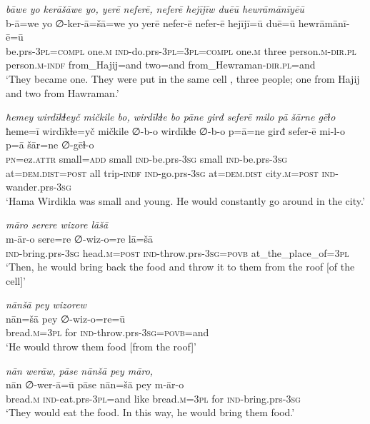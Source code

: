 \ea \label{BP.141}
\textit{bāwe yo kerāšāwe yo, yerē neferē, neferē hejījīw duēū hewrāmānīyēū} \\ 
\gll b-ā=we yo ∅-ker-ā=šā=we yo yerē nefer-ē nefer-ē hejījī=ū duē=ū hewrāmānī-ē=ū \\ 
 be.prs\textsc{-3pl}\textsc{=compl} one\textsc{.m} \textsc{ind-}do.prs\textsc{-3pl}\textsc{=3pl}\textsc{=compl} one\textsc{.m} three person\textsc{.m}\textsc{-dir}\textsc{.pl} person\textsc{.m}\textsc{-indf} from\_Hajij=and two=and from\_Hewraman\textsc{-dir}\textsc{.pl}=and \\ 
\glt `They became one. They were put in the same cell , three people; one from Hajij and two from Hawraman.'
\z 
 
\ea \label{BP.143}
\textit{ħemey wirdīkɫeyč mičkile bo, wirdīkɫe bo pāne girđ seferē milo pā šārne gēɫo} \\ 
\gll ħeme=ī wirdīkɫe=yč mičkile ∅-b-o wirdīkɫe ∅-b-o p=ā=ne girđ sefer-ē mi-l-o p=ā šār=ne ∅-gēɫ-o \\ 
 \textsc{pn}=ez.\textsc{attr} small\textsc{=add} small \textsc{ind-}be.prs\textsc{-3sg} small \textsc{ind-}be.prs\textsc{-3sg} at=\textsc{dem.dist}\textsc{=\textsc{post}} all trip\textsc{-indf} \textsc{ind-}go.prs\textsc{-3sg} at=\textsc{dem.dist} city\textsc{.m}\textsc{=\textsc{post}} \textsc{ind-}wander.prs\textsc{-3sg} \\ 
\glt `Hama Wirdikla was small and young. He would constantly go around in the city.'
\z 
 
\ea \label{BP.145}
\textit{māro serere wizore lāšā} \\ 
\gll m-ār-o sere=re ∅-wiz-o=re lā=šā \\ 
 \textsc{ind-}bring.prs\textsc{-3sg} head\textsc{.m}\textsc{=\textsc{post}} \textsc{ind-}throw.prs\textsc{-3sg}\textsc{=\textsc{povb}} at\_the\_place\_of\textsc{=3pl} \\ 
\glt `Then, he would bring back the food and throw it to them from the roof [of the cell]'
\z 
 
\ea \label{BP.146}
\textit{nānšā pey wizorew} \\ 
\gll nān=šā pey ∅-wiz-o=re=ū \\ 
 bread\textsc{.m}\textsc{=3pl} for \textsc{ind-}throw.prs\textsc{-3sg}\textsc{=\textsc{povb}}=and \\ 
\glt `He would throw them food [from the roof]'
\z 
 
\ea \label{BP.147}
\textit{nān werāw, pāse nānšā pey māro,} \\ 
\gll nān ∅-wer-ā=ū pāse nān=šā pey m-ār-o \\ 
 bread\textsc{.m} \textsc{ind-}eat.prs\textsc{-3pl}=and like bread\textsc{.m}\textsc{=3pl} for \textsc{ind-}bring.prs\textsc{-3sg} \\ 
\glt `They would eat the food. In this way, he would bring them food.'
\z 
 
